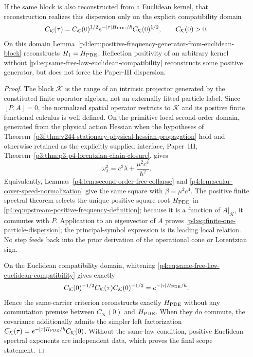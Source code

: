 \documentclass[12pt,a4paper]{article}
\begin{document}
\begin{theorem}
If the same block is also reconstructed from a Euclidean kernel, that
reconstruction realizes this dispersion only on the explicit compatibility
domain
\begin{equation}
\label{p4:eq:same-free-law-euclidean-compatibility}
C_{\mathcal K}(\tau)
=
C_{\mathcal K}(0)^{1/2}
 e^{-|\tau|H_{\rm PDE}/\hbar}
C_{\mathcal K}(0)^{1/2},
\qquad
C_{\mathcal K}(0)>0.
\end{equation}
On this domain
Lemma~\ref{p4:lem:positive-frequency-generator-from-euclidean-block}
reconstructs \(H_1=H_{\rm PDE}\).  Reflection positivity of an arbitrary
kernel without \eqref{p4:eq:same-free-law-euclidean-compatibility} reconstructs
some positive generator, but does not force the Paper-III dispersion.
\end{theorem}

\begin{proof}
The block \(\mathcal K\) is the range of an intrinsic projector generated by
the constituted finite operator algebra, not an externally fitted particle
label.  Since \([P,A]=0\), the normalized spatial operator restricts to
\(\mathcal K\) and its positive finite functional calculus is well defined.
On the primitive local second-order domain, generated from the physical
action Hessian when the hypotheses of
Theorem~\ref{p3f:thm:v244-stationary-physical-hessian-propagation} hold and
otherwise retained as the explicitly supplied interface, Paper~III,
Theorem~\ref{p3:thm:p3-p4-lorentzian-chain-closure}, gives
\[
\omega_\lambda^2
=c^2\lambda+\frac{\mu^2c^4}{\hbar^2}.
\]
Equivalently, Lemmas~\ref{p4:lem:second-order-free-collapse} and
\ref{p4:lem:scalar-cover-speed-normalization} give the same square with
\(\beta=\mu^2c^4\).  The positive finite spectral theorem selects the unique
positive square root \(H_{\rm PDE}\) in
\eqref{p4:eq:upstream-positive-frequency-definition}; because it is a
function of \(A|_{\mathcal K}\), it commutes with \(P\).
Application to an eigenvector of \(A\) proves
\eqref{p4:eq:finite-one-particle-dispersion}; the principal-symbol expression
is its leading local relation.  No step feeds back into the prior derivation
of the operational cone or Lorentzian sign.

On the Euclidean compatibility domain, whitening
\eqref{p4:eq:same-free-law-euclidean-compatibility} gives exactly
\[
 C_{\mathcal K}(0)^{-1/2}C_{\mathcal K}(\tau)
 C_{\mathcal K}(0)^{-1/2}
 =e^{-|\tau|H_{\rm PDE}/\hbar}.
\]
Hence the same-carrier criterion reconstructs exactly \(H_{\rm PDE}\)
without any commutation premise between \(C_{\mathcal K}(0)\) and
\(H_{\rm PDE}\).  When they do commute, the covariance additionally admits
the simpler left factorization
\(C_{\mathcal K}(\tau)=e^{-|\tau|H_{\rm PDE}/\hbar}C_{\mathcal K}(0)\).
Without the same-law condition, positive Euclidean spectral exponents are
independent data, which proves the final scope statement.
\end{proof}
\end{document}
